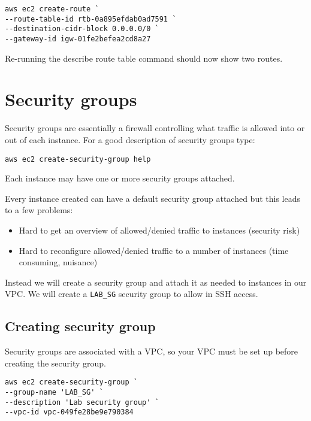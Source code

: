 \begin{verbatim}
aws ec2 create-route `
--route-table-id rtb-0a895efdab0ad7591 `
--destination-cidr-block 0.0.0.0/0 `
--gateway-id igw-01fe2befea2cd8a27
\end{verbatim}

Re-running the describe route table command should now show two routes.

\section{Security groups}\label{security-groups}

Security groups are essentially a firewall controlling what traffic is
allowed into or out of each instance. For a good description of security
groups type:

\begin{verbatim}
aws ec2 create-security-group help
\end{verbatim}

Each instance may have one or more security groups attached.

Every instance created can have a default security group attached but
this leads to a few problems:

\begin{itemize}
\item
  Hard to get an overview of allowed/denied traffic to instances
  (security risk)
\item
  Hard to reconfigure allowed/denied traffic to a number of instances
  (time consuming, nuisance)
\end{itemize}

Instead we will create a security group and attach it as needed to
instances in our VPC. We will create a \texttt{LAB\_SG} security group
to allow in SSH access.

\subsection{Creating security group}\label{sec:creating-security-group}

Security groups are associated with a VPC, so your VPC must be set up
before creating the security group.

\begin{verbatim}
aws ec2 create-security-group `
--group-name 'LAB_SG' `
--description 'Lab security group' `
--vpc-id vpc-049fe28be9e790384
\end{verbatim}

